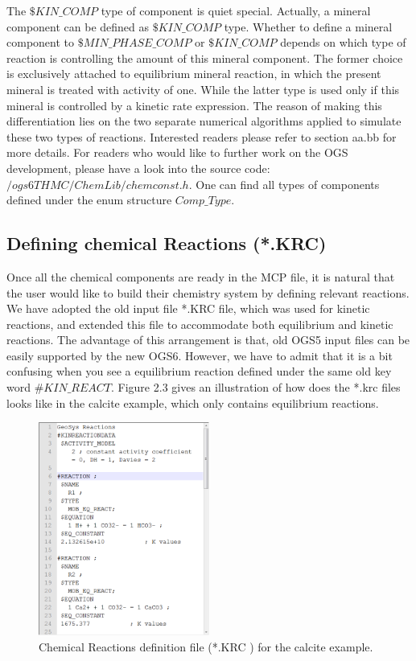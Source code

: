 The $\$KIN\_COMP$ type of component is quiet special. Actually, a mineral component can be defined as $\$KIN\_COMP$ type. Whether to define a mineral component to $\$MIN\_PHASE\_COMP$ or $\$KIN\_COMP$ depends on which type of reaction is controlling the amount of this mineral component. The former choice is exclusively attached to equilibrium mineral reaction, in which the present mineral is treated with activity of one. While the latter type is used only if this mineral is controlled by a kinetic rate expression. The reason of making this differentiation lies on the two separate numerical algorithms applied to simulate these two types of reactions. Interested readers please refer to section aa.bb for more details. For readers who would like to further work on the OGS development, please have a look into the source code: $\slash ogs6THMC \slash ChemLib \slash chemconst.h$.  One can find all types of components defined under the enum structure $Comp\_Type$. 


\subsection{Defining chemical Reactions (*.KRC)}

Once all the chemical components are ready in the MCP file, it is natural that the user would like to build their chemistry system by defining relevant reactions. We have adopted the old input file *.KRC file, which was used for kinetic reactions, and extended this file to accommodate both equilibrium and kinetic reactions. The advantage of this arrangement is that, old OGS5 input files can be easily supported by the new OGS6. However, we have to admit that it is a bit confusing when you see a equilibrium reaction defined under the same old key word $\#KIN\_REACT$. Figure 2.3 gives an illustration of how does the *.krc files looks like in the calcite example, which only contains equilibrium reactions. 

\begin{figure}
\includegraphics[width=0.5\textwidth]{RT/figs/RT_fig_krc_file}
\caption{Chemical Reactions definition file (*.KRC ) for the calcite example. }
\label{fig:RT_krc_file}
\end{figure}

